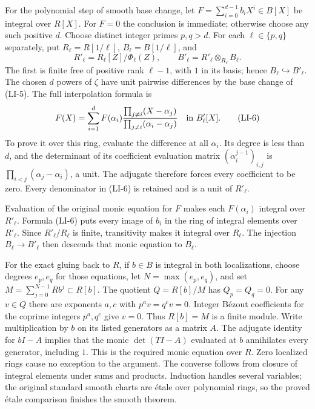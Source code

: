 For the polynomial step of smooth base change, let \(F=\sum_{i=0}^{d-1}b_iX^i\in B[X]\) be integral over \(R[X]\). For \(F=0\) the conclusion is immediate; otherwise choose any such positive \(d\). Choose distinct integer primes \(p,q>d\). For each \(\ell\in\{p,q\}\) separately, put \(R_\ell=R[1/\ell]\), \(B_\ell=B[1/\ell]\), and \[
R'_\ell=R_\ell[Z]/\Phi_\ell(Z),\qquad
B'_\ell=R'_\ell\otimes_{R_\ell}B_\ell.
\] The first is finite free of positive rank \(\ell-1\), with \(1\) in its basis; hence \(B_\ell\hookrightarrow B'_\ell\). The chosen \(d\) powers of \(\zeta\) have unit pairwise differences by the base change of (LI-5). The full interpolation formula is \[
F(X)=\sum_{i=1}^d F(\alpha_i)
\frac{\prod_{j\ne i}(X-\alpha_j)}
{\prod_{j\ne i}(\alpha_i-\alpha_j)}
\quad\hbox{in }B'_\ell[X].
\tag{LI-6}
\] To prove it over this ring, evaluate the difference at all \(\alpha_i\). Its degree is less than \(d\), and the determinant of its coefficient evaluation matrix \((\alpha_i^{j-1})_{i,j}\) is \(\prod_{i<j}(\alpha_j-\alpha_i)\), a unit. The adjugate therefore forces every coefficient to be zero. Every denominator in (LI-6) is retained and is a unit of \(R'_\ell\).

Evaluation of the original monic equation for \(F\) makes each \(F(\alpha_i)\) integral over \(R'_\ell\). Formula (LI-6) puts every image of \(b_i\) in the ring of integral elements over \(R'_\ell\). Since \(R'_\ell/R_\ell\) is finite, transitivity makes it integral over \(R_\ell\). The injection \(B_\ell\to B'_\ell\) then descends that monic equation to \(B_\ell\).

For the exact gluing back to \(R\), if \(b\in B\) is integral in both localizations, choose degrees \(e_p,e_q\) for those equations, let \(N=\max(e_p,e_q)\), and set \(M=\sum_{j=0}^{N-1}Rb^j\subset R[b]\). The quotient \(Q=R[b]/M\) has \(Q_p=Q_q=0\). For any \(v\in Q\) there are exponents \(a,c\) with \(p^av=q^cv=0\). Integer Bézout coefficients for the coprime integers \(p^a,q^c\) give \(v=0\). Thus \(R[b]=M\) is a finite module. Write multiplication by \(b\) on its listed generators as a matrix \(A\). The adjugate identity for \(bI-A\) implies that the monic \(\det(TI-A)\) evaluated at \(b\) annihilates every generator, including \(1\). This is the required monic equation over \(R\). Zero localized rings cause no exception to the argument. The converse follows from closure of integral elements under sums and products. Induction handles several variables; the original standard smooth charts are étale over polynomial rings, so the proved étale comparison finishes the smooth theorem.

